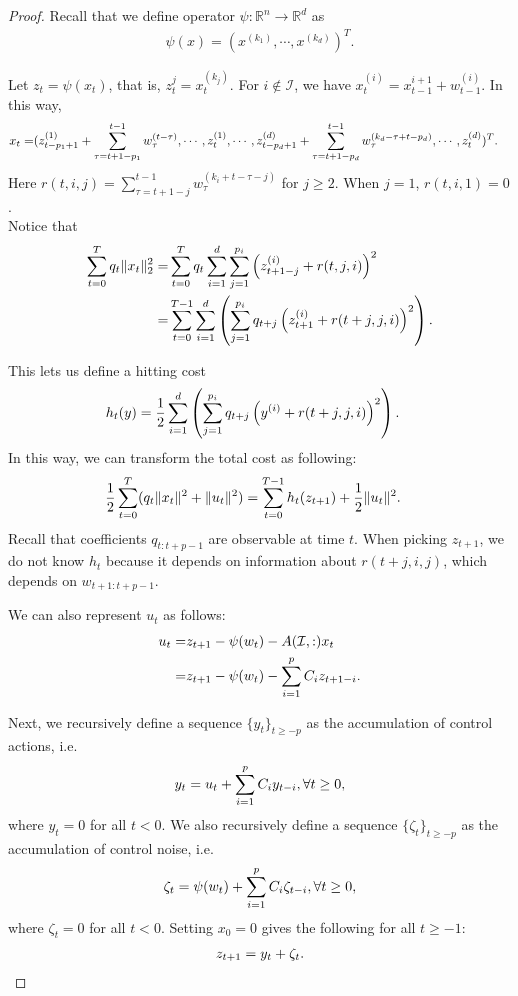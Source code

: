 \begin{proof}
Recall that we define operator $\psi:\mathbb{R}^n\to\mathbb{R}^d$ as 
\begin{align}
    \psi(x)=\left(x^{(k_1)},\cdots,x^{(k_d)}\right)^T.
\end{align}

Let $z_t=\psi(x_t)$, that is, $z_t^j=x_t^{(k_j)}$. For $i\notin\mathcal{I}$, we have $x_t^{(i)}=x_{t-1}^{i+1}+w_{t-1}^{(i)}$. In this way,
\begin{align}
    x_t=&(z_{t-p_1+1}^{(1)}+\sum_{\tau=t+1-p_1}^{t-1}w_{\tau}^{(t-\tau)},\cdots,z_{t}^{(1)},\cdots,z_{t-p_d+1}^{(d)}+\sum_{\tau=t+1-p_d}^{t-1}w_{\tau}^{(k_d-\tau+t-p_d)},\cdots,z_t^{(d)})^T.\notag
\end{align}
Here $r(t,i,j)=\sum_{\tau=t+1-j}^{t-1}w_{\tau}^{(k_i+t-\tau-j)}$ for $j\ge2$. When $j=1$, $r(t,i,1)=0$.\\
Notice that
\begin{align}
    \sum_{t=0}^Tq_t\|x_t\|^2_2=&\sum_{t=0}^Tq_t\sum_{i=1}^d\sum_{j=1}^{p_i}\left(z_{t+1-j}^{(i)}+r(t,j,i)\right)^2\notag\\
    =&\sum_{t=0}^{T-1}\sum_{i=1}^d\left(\sum_{j=1}^{p_i}q_{t+j}\left(z_{t+1}^{(i)}+r(t+j,j,i)\right)^2\right).\notag
\end{align}

This lets us define a hitting cost
\begin{align}
    &h_t(y)=\frac{1}{2}\sum_{i=1}^d\left(\sum_{j=1}^{p_i}q_{t+j}\left(y^{(i)}+r(t+j,j,i)\right)^2\right).\notag
\end{align}
In this way, we can transform the total cost as following:
\begin{align}
    &\frac{1}{2}\sum_{t=0}^T(q_t\|x_t\|^2+\|u_t\|^2)=\sum_{t=0}^{T-1}h_t(z_{t+1})+\frac{1}{2}\|u_t\|^2.\notag
\end{align}
Recall that coefficients $q_{t:t+p-1}$ are observable at time $t$. When picking $z_{t+1}$, we do not know $h_t$ because it depends on information about $r(t+j,i,j)$, which depends on $w_{t+1:t+p-1}$.

We can also represent $u_t$ as follows:
\begin{align}
    u_t=&z_{t+1}-\psi(w_t)-A(\mathcal{I,:})x_t\notag\\
    =&z_{t+1}-\psi(w_t)-\sum_{i=1}^pC_iz_{t+1-i}.\notag
\end{align}

Next, we recursively define a sequence $\{y_t\}_{t\ge-p}$ as the accumulation of control actions, i.e.
\begin{align}
    y_t=u_t+\sum_{i=1}^pC_iy_{t-i},\forall t\ge0,\notag
\end{align}
where $y_t=0$ for all $t<0$. We also recursively define a sequence $\{\zeta_t\}_{t\ge-p}$ as the accumulation of control noise, i.e.
\begin{align}
    \zeta_t=\psi(w_t)+\sum_{i=1}^pC_i\zeta_{t-i},\forall t\ge0,\notag
\end{align}
where $\zeta_t=0$ for all $t<0$. Setting $x_0=0$ gives the following for all $t\ge-1$:
\begin{align}
    z_{t+1}=y_t+\zeta_t\notag.
\end{align}


\end{proof}
